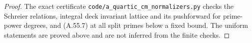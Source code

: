 \begin{proof}
The exact certificate \texttt{code/a\_quartic\_cm\_normalizers.py} checks the
Schreier relations, integral deck invariant lattice and its
pushforward for prime-power degrees, and (A.55.7) at all
split primes below a fixed bound. The uniform statements are
proved above and are not inferred from the finite checks.
\end{proof}
